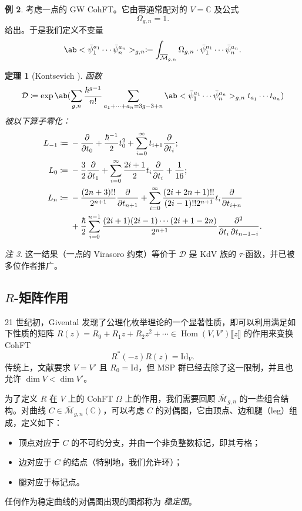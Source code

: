 \documentclass{amsart}
\newtheorem{thm}{定理}[section]
\theoremstyle{definition}
\newtheorem{exm}[thm]{例}
\theoremstyle{remark}
\newtheorem{rmk}[thm]{注}
\theoremstyle{plain}
\theoremstyle{definition}
\theoremstyle{remark}
\newcommand{\C}{\mathbb{C}}
\newcommand{\Mbar}{\overline{\mathcal{M}}}
\newcommand{\mc}[1]{\mathcal{#1}}
\newcommand{\mr}[1]{\mathrm{#1}}
\newcommand{\1}{\mathbf{1}}
\newcommand{\2}{\mathbf{2}}
\newcommand{\3}{\mathbf{3}}
\newcommand{\ps}[1]{\llbracket #1 \rrbracket}
\DeclareMathOperator{\Hom}{Hom}
\begin{document}
\begin{exm}
    考虑一点的 GW CohFT。它由带通常配对的 $V = \C$ 及公式
    \[ \Omega_{g,n} = 1. \]
    给出。于是我们定义不变量
    \[ \ab<\bar{\psi}_1^{a_1} \cdots \bar{\psi}_n^{a_n}>_{g,n} \coloneqq \int_{\Mbar_{g,n}} \Omega_{g,n} \cdot \bar{\psi}_1^{a_1} \cdots \bar{\psi}_n^{a_n}. \]
    \begin{thm}[Kontsevich {\cite{Kontsevich1992}}]
        函数
        \[ \mc{D} \coloneqq \exp \ab(\sum_{g,n} \frac{\hbar^{g-1}}{n!}\sum_{a_1 + \cdots + a_n = 3g-3+n} \ab<\bar{\psi}_1^{a_1} \cdots \bar{\psi}_n^{a_n}>_{g,n} t_{a_1}\cdots t_{a_n}) \]
        被以下算子零化：
        \begin{align*}
            L_{-1} \coloneqq{}& -\pdv{}{t_0} + \frac{\hbar^{-1}}{2} t_0^2 + \sum_{i=0}^{\infty} t_{i+1} \pdv{}{t_i};\\
            L_0 \coloneqq{}& -\frac{3}{2} \pdv{}{t_1} + \sum_{i=0}^{\infty} \frac{2i+1}{2} t_i \pdv{}{t_i} + \frac{1}{16};\\
            L_n \coloneqq{}& -\frac{(2n+3)!!}{2^{n+1}} \pdv{}{t_{n+1}} + \sum_{i=0}^{\infty} \frac{(2i+2n+1)!!}{(2i-1)!! 2^{n+1}} t_i \pdv{}{t_{i+n}} \\
            &+ \frac{\hbar}{2} \sum_{i=0}^{n-1} \frac{(2i+1) (2i-1) \cdots (2i+1-2n)}{2^{n+1}} \pdv{}{t_i,t_{n-1-i}}.
        \end{align*}
    \end{thm}
\end{exm}

\begin{rmk}
    这一结果（一点的 Virasoro 约束）等价于 $\mc{D}$ 是 KdV 族的 \(\tau\)-函数，并已被多位作者推广。
\end{rmk}




\subsection{\(R\)-矩阵作用}%
\label{sub:R-matrix action}

21 世纪初，Givental 发现了公理化枚举理论的一个显著性质，即可以利用满足如下性质的矩阵 $R(z) = R_0 + R_1 z + R_2 z^2 + \cdots \in \Hom(V, V')\ps{z}$ 的作用来变换 CohFT
\[ R^*(-z) R(z) = \mr{Id}_V. \]
传统上，文献要求 $V = V'$ 且 $R_0 = \mr{Id}$，但 MSP 群已经去除了这一限制，并且也允许 $\dim V < \dim V'$。

为了定义 $R$ 在 $V$ 上的 CohFT $\Omega$ 上的作用，我们需要回顾 $\Mbar_{g,n}$ 的一些组合结构。对曲线 $C\in \Mbar_{g,n}(\C)$，可以考虑 $C$ 的对偶图，它由顶点、边和腿（leg）组成，定义如下：
\begin{itemize}
    \item 顶点对应于 $C$ 的不可约分支，并由一个非负整数标记，即其亏格；
    \item 边对应于 $C$ 的结点（特别地，我们允许环）；
    \item 腿对应于标记点。
\end{itemize}
任何作为稳定曲线的对偶图出现的图都称为 \textit{稳定图}。
\end{document}
